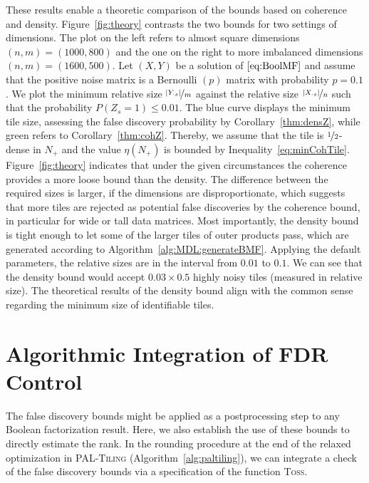 These results enable a theoretic comparison of the bounds based on coherence and density. Figure~\ref{fig:theory} contrasts the two bounds for two settings of dimensions. The plot on the left refers to almost square dimensions $(n,m)=(1000,800)$ and the one on the right to more imbalanced dimensions $(n,m)=(1600,500)$. Let $(X,Y)$ be a solution of $\eqref{eq:BoolMF}$ and assume that the positive noise matrix is a Bernoulli $(p)$ matrix with probability $p=0.1$. We plot the minimum relative size $\nicefrac{|Y_{\cdot s}|}{m}$ against the relative size $\nicefrac{|X_{\cdot s}|}{n}$ such that the probability $P(Z_s=1)\leq 0.01$. The blue curve displays the minimum tile size, assessing the false discovery probability by Corollary~\ref{thm:densZ}, while green refers to Corollary~\ref{thm:cohZ}. Thereby, we assume that the tile is $\nicefrac{1}{2}$-dense in $N_+$ and the value $\eta(N_+)$ is bounded by Inequality~\eqref{eq:minCohTile}. Figure~\ref{fig:theory} indicates that under the given circumstances the coherence provides a more loose bound than the density. The difference between the required sizes is larger, if the dimensions are disproportionate, which suggests that more tiles are rejected as potential false discoveries by the coherence bound, in particular for wide or tall data matrices. Most importantly, the density bound is tight enough to let some of the larger tiles of outer products pass, which are generated according to Algorithm~\ref{alg:MDL:generateBMF}. Applying the default parameters, the relative sizes are in the interval from $0.01$ to $0.1$. We can see that the density bound would accept $0.03\times 0.5$ highly noisy tiles (measured in relative size). The theoretical results of the density bound align with the common sense regarding the minimum size of identifiable tiles.   
\section{Algorithmic Integration of FDR Control}\label{sec:TP:algorithmicIntegration}
The false discovery bounds might be applied as a postprocessing step to any Boolean factorization result. Here, we also establish the use of these bounds to directly estimate the rank.
In the rounding procedure at the end of the relaxed optimization in \textsc{PAL-Tiling} (Algorithm~\ref{alg:paltiling}), we can integrate a check of the false discovery bounds via a specification of the function \textsc{Toss}.
 
